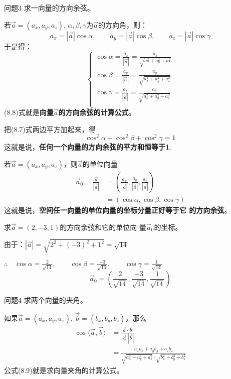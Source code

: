 \begin{blk}
    {问题3} 求一向量的方向余弦。
\end{blk}

若$\vec{a}=(a_x,a_y,a_z)$, $\alpha,\beta,\gamma$为$\vec{a}$的方向角，则：
\[a_x=|\vec{a}|\cos\alpha,\qquad a_y=|\vec{a}|\cos\beta,\qquad a_z=|\vec{a}|\cos\gamma\]
于是得：
\begin{equation}
    \begin{cases}
    \cos\alpha=\frac{a_x}{|\vec{a}|}=\frac{a_x}{\sqrt{a^2_x+a^2_y+a^2_z}}\\
    \cos\beta=\frac{a_y}{|\vec{a}|}=\frac{a_y}{\sqrt{a^2_x+a^2_y+a^2_z}}\\
    \cos\gamma=\frac{a_z}{|\vec{a}|}=\frac{a_z}{\sqrt{a^2_x+a^2_y+a^2_z}}\\        
    \end{cases}
\end{equation}
(8.8)式就是\textbf{向量$\vec{a}$的方向余弦的计算公式}。

把(8.7)式两边平方加起来，得
\[\cos^2\alpha+\cos^2\beta+\cos^2\gamma=1\]
这就是说，\textbf{任何一个向量的方向余弦的平方和恒等于1}.

若$\vec{a}=(a_x,a_y,a_z)$，则$\vec{a}$的单位向量
\[\begin{split}
    \vec{a}_0=\frac{\vec{a}}{|\vec{a}|}&=\left(\frac{a_x}{|\vec{a}|},\frac{a_y}{|\vec{a}|},\frac{a_z}{|\vec{a}|}\right)\\
    &=(\cos\alpha,\cos\beta,\cos\gamma)
\end{split}\]
这就是说，\textbf{空间任一向量的单位向量的坐标分量正好等于它
的方向余弦}。

\begin{example}
    求$\vec{a}=(2,-3,1)$的方向余弦和它的单位向
量$\vec{a}_0$的坐标。
\end{example}

\begin{solution}
由于：$|\vec{a}|=\sqrt{2^2+(-3)^2+1^2}=\sqrt{14}$

$\therefore\quad \cos\alpha=\frac{2}{\sqrt{14}},\qquad \cos\beta=\frac{-3}{\sqrt{14}},\qquad \cos\gamma=\frac{1}{\sqrt{14}}$
\[\vec{a}_0=\left(\frac{2}{\sqrt{14}},\frac{-3}{\sqrt{14}},\frac{1}{\sqrt{14}}\right)\]
\end{solution}

\begin{blk}
    {问题4}
求两个向量的夹角。
\end{blk}

如果$\vec{a}=(a_x,a_y,a_z)$, $\vec{b}=(b_x,b_y,b_z)$，那么
\begin{equation}
    \begin{split}
\cos\langle \vec{a},\vec{b}\rangle &=\frac{\vec{a}\cdot \vec{b}}{|\vec{a}||\vec{b}|}\\
&=\frac{a_xb_x+a_yb_y+a_zb_z}{\sqrt{a^2_x+a^2_y+a^2_z}\cdot \sqrt{b^2_x+b^2_y+b^2_z}}
    \end{split}
\end{equation}
公式(8.9)就是求向量夹角的计算公式。



